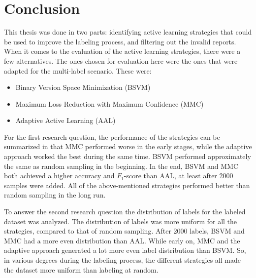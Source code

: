
\chapter{Conclusion}
\label{cha:conclusion}

This thesis was done in two parts: identifying active learning strategies that could be used to improve the labeling process, and filtering out the invalid reports.
When it comes to the evaluation of the active learning strategies, there were a few alternatives.
The ones chosen for evaluation here were the ones that were adapted for the multi-label scenario.
These were: 
\begin{itemize}
    \item Binary Version Space Minimization (BSVM)
    \item Maximum Loss Reduction with Maximum Confidence (MMC)
    \item Adaptive Active Learning (AAL)
\end{itemize}

For the first research question, the performance of the strategies can be summarized in that MMC performed worse in the early stages, while the adaptive approach worked the best during the same time.
BSVM performed approximately the same as random sampling in the beginning.
In the end, BSVM and MMC both achieved a higher accuracy and $F_1$-score than AAL, at least after 2000 samples were added.
All of the above-mentioned strategies performed better than random sampling in the long run.

To answer the second research question the distribution of labels for the labeled dataset was analyzed.
The distribution of labels was more uniform for all the strategies, compared to that of random sampling.
After 2000 labels, BSVM and MMC had a more even distribution than AAL.
While early on, MMC and the adaptive approach generated a lot more even label distribution than BSVM.
So, in various degrees during the labeling process, the different strategies all made the dataset more uniform than labeling at random.

